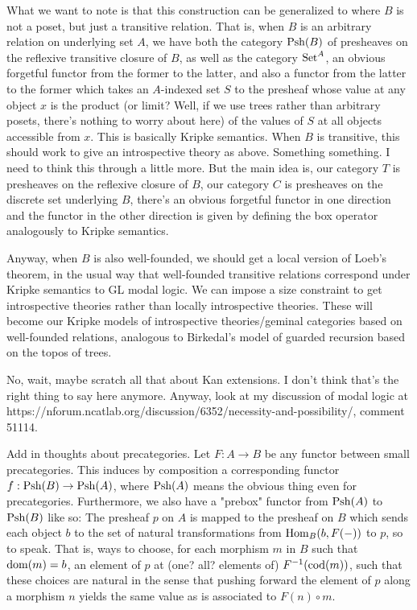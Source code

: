 \begin{TODOblock}
What we want to note is that this construction can be generalized to where $B$ is not a poset, but just a transitive relation. That is, when $B$ is an arbitrary relation on underlying set $A$, we have both the category $\operatorname{Psh}(B)$ of presheaves on the reflexive transitive closure of $B$, as well as the category $\mathrm{Set}^A$, an obvious forgetful functor from the former to the latter, and also a functor from the latter to the former which takes an $A$-indexed set $S$ to the presheaf whose value at any object $x$ is the product (or limit? Well, if we use trees rather than arbitrary posets, there's nothing to worry about here) of the values of $S$ at all objects accessible from $x$. This is basically Kripke semantics. When $B$ is transitive, this should work to give an introspective theory as above. Something something. I need to think this through a little more. But the main idea is, our category $T$ is presheaves on the reflexive closure of $B$, our category $C$ is presheaves on the discrete set underlying $B$, there's an obvious forgetful functor in one direction and the functor in the other direction is given by defining the box operator analogously to Kripke semantics.

Anyway, when $B$ is also well-founded, we should get a local version of Loeb's theorem, in the usual way that well-founded transitive relations correspond under Kripke semantics to GL modal logic. We can impose a size constraint to get introspective theories rather than locally introspective theories. These will become our Kripke models of introspective theories/geminal categories based on well-founded relations, analogous to Birkedal's model of guarded recursion based on the topos of trees.

No, wait, maybe scratch all that about Kan extensions. I don't think that's the right thing to say here anymore. Anyway, look at my discussion of modal logic at https://nforum.ncatlab.org/discussion/6352/necessity-and-possibility/, comment 51114.

Add in thoughts about precategories. Let $F : A \to B$ be any functor between small precategories. This induces by composition a corresponding functor $f : \operatorname{Psh}(B) \to \operatorname{Psh}(A)$, where $\operatorname{Psh}(A)$ means the obvious thing even for precategories. Furthermore, we also have a "prebox" functor from $\operatorname{Psh}(A)$ to $\operatorname{Psh}(B)$ like so: The presheaf $p$ on $A$ is mapped to the presheaf on $B$ which sends each object $b$ to the set of natural transformations from $\operatorname{Hom}_B(b, F(-))$ to $p$, so to speak. That is, ways to choose, for each morphism $m$ in $B$ such that $\operatorname{dom}(m) = b$, an element of $p$ at (one? all? elements of) $F^{-1}(\operatorname{cod}(m))$, such that these choices are natural in the sense that pushing forward the element of $p$ along a morphism $n$ yields the same value as is associated to $F(n) \circ m$.


\end{TODOblock}
